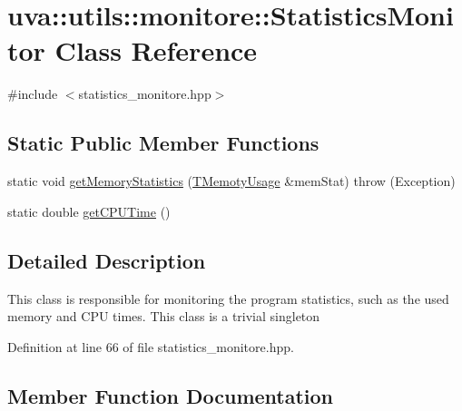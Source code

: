 \hypertarget{classuva_1_1utils_1_1monitore_1_1_statistics_monitor}{}\section{uva\+:\+:utils\+:\+:monitore\+:\+:Statistics\+Monitor Class Reference}
\label{classuva_1_1utils_1_1monitore_1_1_statistics_monitor}


{\ttfamily \#include $<$statistics\+\_\+monitore.\+hpp$>$}

\subsection*{Static Public Member Functions}
\begin{DoxyCompactItemize}
\item 
static void \hyperlink{classuva_1_1utils_1_1monitore_1_1_statistics_monitor_a12b52cb3e94cf0c21dba5bad034ed7d1}{get\+Memory\+Statistics} (\hyperlink{namespaceuva_1_1utils_1_1monitore_aa3ee5e440e3d902d9b6d26a24aa95c39}{T\+Memoty\+Usage} \&mem\+Stat)  throw (\+Exception)
\item 
static double \hyperlink{classuva_1_1utils_1_1monitore_1_1_statistics_monitor_a85b7c8186ab6331e64a12c67991c6d15}{get\+C\+P\+U\+Time} ()
\end{DoxyCompactItemize}


\subsection{Detailed Description}
This class is responsible for monitoring the program statistics, such as the used memory and C\+P\+U times. This class is a trivial singleton 

Definition at line 66 of file statistics\+\_\+monitore.\+hpp.



\subsection{Member Function Documentation}
\hypertarget{classuva_1_1utils_1_1monitore_1_1_statistics_monitor_a85b7c8186ab6331e64a12c67991c6d15}{}
